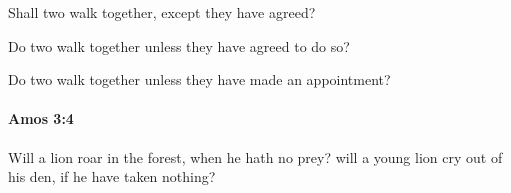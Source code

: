 			\begin{versebox}
					\item[BHS] 
					\item[LXX] 
					\item[ASV] Shall two walk together, except they have agreed?
					\item[NIV] Do two walk together unless they have agreed to do so?
					\item[NRSV] Do two walk together unless they have made an appointment?
			\end{versebox}

		\paragraph{Amos 3:4} %
			\label{AMOS-3-4}

			Will a lion roar in the forest, when he hath no prey? will a young lion cry out of his den, if he have taken nothing?

